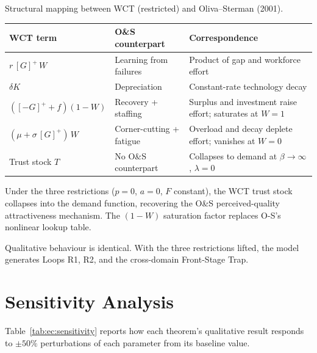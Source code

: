 \documentclass[msom,dblanonrev]{informs4}
\newcommand{\Gp}{[G]^{+}}
\newcommand{\Gm}{[-G]^{+}}
\begin{document}
\begin{table}
\TABLE
{Structural mapping between WCT (restricted) and Oliva--Sterman (2001).\label{tab:ec:mapping}}
{\begin{tabular}{@{}lll@{}}
\toprule
\textbf{WCT term} & \textbf{O\&S counterpart} & \textbf{Correspondence} \\
\midrule
$r\,\Gp\,W$ & Learning from failures & Product of gap and workforce effort \\
$\delta K$ & Depreciation & Constant-rate technology decay \\
$(\Gm + f)(1-W)$ & Recovery + staffing & Surplus and investment raise effort; saturates at $W{=}1$ \\
$(\mu + \sigma\,\Gp)\,W$ & Corner-cutting + fatigue & Overload and decay deplete effort; vanishes at $W{=}0$ \\
\addlinespace
Trust stock $T$ & No O\&S counterpart & Collapses to demand at $\beta \to \infty$, $\lambda = 0$ \\
\bottomrule
\end{tabular}}
{Under the three restrictions ($p{=}0$, $a{=}0$, $F$ constant), the WCT trust stock collapses into the demand function, recovering the O\&S perceived-quality attractiveness mechanism. The $(1{-}W)$ saturation factor replaces O-S's nonlinear lookup table.}
\end{table}

Qualitative behaviour is identical. With the three restrictions lifted, the model generates Loops R1, R2, and the cross-domain Front-Stage Trap.

\section{Sensitivity Analysis}\label{sec:ec:sensitivity}

Table~\ref{tab:ec:sensitivity} reports how each theorem's qualitative result responds to $\pm 50\%$ perturbations of each parameter from its baseline value.
\end{document}
